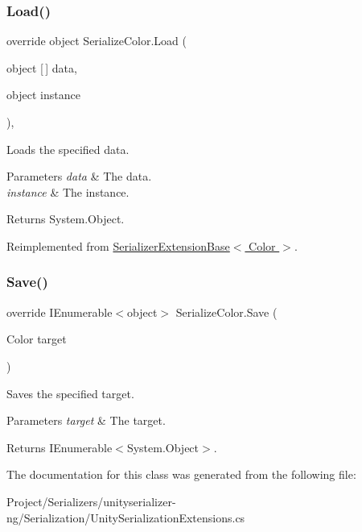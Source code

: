 \subsubsection{\texorpdfstring{Load()}{Load()}}
{\footnotesize\ttfamily override object Serialize\+Color.\+Load (\begin{DoxyParamCaption}\item[{object \mbox{[}$\,$\mbox{]}}]{data,  }\item[{object}]{instance }\end{DoxyParamCaption})\hspace{0.3cm}{\ttfamily [inline]}, {\ttfamily [virtual]}}



Loads the specified data. 


\begin{DoxyParams}{Parameters}
{\em data} & The data.\\
\hline
{\em instance} & The instance.\\
\hline
\end{DoxyParams}
\begin{DoxyReturn}{Returns}
System.\+Object.
\end{DoxyReturn}


Reimplemented from \hyperlink{class_serializer_extension_base_a3792a9b27056e30ca0ac91531936ae47}{Serializer\+Extension\+Base$<$ Color $>$}.

\mbox{\label{class_serialize_color_aab21b448e72e3474845cc3120ea4e34c}} 
\subsubsection{\texorpdfstring{Save()}{Save()}}
{\footnotesize\ttfamily override I\+Enumerable$<$object$>$ Serialize\+Color.\+Save (\begin{DoxyParamCaption}\item[{Color}]{target }\end{DoxyParamCaption})\hspace{0.3cm}{\ttfamily [inline]}}



Saves the specified target. 


\begin{DoxyParams}{Parameters}
{\em target} & The target.\\
\hline
\end{DoxyParams}
\begin{DoxyReturn}{Returns}
I\+Enumerable$<$System.\+Object$>$.
\end{DoxyReturn}


The documentation for this class was generated from the following file\+:\begin{DoxyCompactItemize}
\item 
Project/\+Serializers/unityserializer-\/ng/\+Serialization/Unity\+Serialization\+Extensions.\+cs\end{DoxyCompactItemize}

